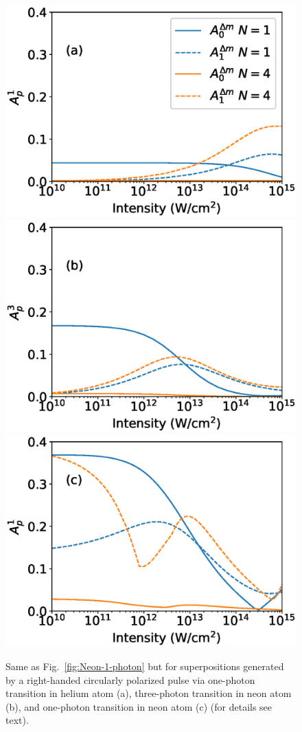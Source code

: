 \begin{figure}[t]
\centering
\includegraphics[width=0.32\linewidth]{figs/Photo_ionization/GAP/He_2p1.eps}
\includegraphics[width=0.32\linewidth]{figs/Photo_ionization/GAP/Ne_2p-1_3d2_3p-combined.eps}
\includegraphics[width=0.32\linewidth]{figs/Photo_ionization/GAP/Ne_2p-1_3d0_1p-combined.eps}
\caption{
Same as Fig.~\ref{fig:Neon-1-photon} but for
superpositions generated by a right-handed circularly polarized pulse
via one-photon transition in helium atom (a),  
three-photon transition in neon atom (b), and 
one-photon transition in neon atom (c) (for details see text).
} 
  \label{fig:combined_data}
\end{figure}

